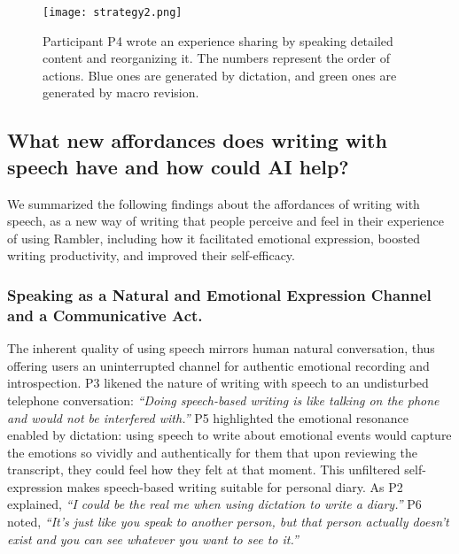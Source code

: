 \begin{figure}
    \centering
    \texttt{[image: strategy2.png]}
    \caption{Participant P4 wrote an experience sharing by speaking detailed content and reorganizing it. The numbers represent the order of actions. Blue ones are generated by dictation, and green ones are generated by macro revision.}
    \label{fig:str2}
\end{figure}

\subsection{What new affordances does writing with speech have and how could AI help?}

We summarized the following findings about the affordances of writing with speech, as a new way of writing that people perceive and feel in their experience of using Rambler, including how it facilitated emotional expression, boosted writing productivity, and improved their self-efficacy. 

\subsubsection{Speaking as a Natural and Emotional Expression Channel and a Communicative Act.}
The inherent quality of using speech mirrors human natural conversation, thus offering users an uninterrupted channel for authentic emotional recording and introspection. 
P3 likened the nature of writing with speech to an undisturbed telephone conversation:\textit{ ``Doing speech-based writing is like talking on the phone and would not be interfered with.''} 
P5 highlighted the emotional resonance enabled by dictation: using speech to write about emotional events would capture the emotions so vividly and authentically for them that upon reviewing the transcript, they could feel how they felt at that moment.
This unfiltered self-expression makes speech-based writing suitable for personal diary. 
As P2 explained, \textit{``I could be the real me when using dictation to write a diary.''}
P6 noted, \textit{``It's just like you speak to another person, but that person actually doesn't exist and you can see whatever you want to see to it.''}

